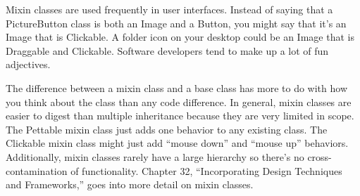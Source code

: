Mixin classes are used frequently in user interfaces. Instead of saying that a PictureButton class is both an Image and a Button, you might say that it’s an Image that is Clickable. A folder icon on your desktop could be an Image that is Draggable and Clickable. Software developers tend to make up a lot of fun adjectives.

The difference between a mixin class and a base class has more to do with how you think about the class than any code difference. In general, mixin classes are easier to digest than multiple inheritance because they are very limited in scope. The Pettable mixin class just adds one behavior to any existing class. The Clickable mixin class might just add “mouse down” and “mouse up” behaviors. Additionally, mixin classes rarely have a large hierarchy so there’s no cross-contamination of functionality. Chapter 32, “Incorporating Design Techniques and Frameworks,” goes into more detail on mixin classes.






























